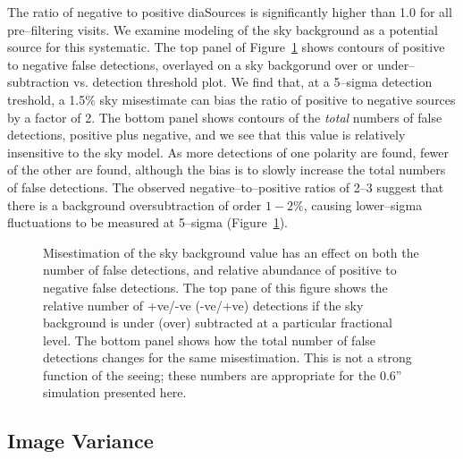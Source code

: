 \documentclass[floatfix, apj]{emulateapj}
\begin{document}
The ratio of negative to positive diaSources is significantly higher than 1.0 for all pre--filtering visits.
We examine modeling of the sky background as a potential source for this systematic.
The top panel of Figure~\ref{fig:2} shows contours of positive to negative false detections, overlayed on a sky backgorund over or under--subtraction vs. detection threshold plot.
We find that, at a 5--sigma detection treshold, a 1.5\% sky misestimate can bias the ratio of positive to negative sources by a factor of 2.
The bottom panel shows contours of the {\it total} numbers of false detections, positive plus negative, and we see that this value is relatively insensitive to the sky model.
As more detections of one polarity are found, fewer of the other are found, although the bias is to slowly increase the total numbers of false detections.
The observed negative--to--positive ratios of 2--3 suggest that there is a background oversubtraction of order $1-2\%$, causing lower--sigma fluctuations to be measured at 5--sigma (Figure~\ref{fig:2}).
\begin{figure}[!ht]
\centering
{}
\caption{
Misestimation of the sky background value has an effect on both the number of false detections, and relative abundance of positive to negative false detections.
The top pane of this figure shows the relative number of +ve/-ve (-ve/+ve) detections if the sky background is under (over) subtracted at a particular fractional level.
The  bottom panel shows how the total number of false detections changes for the same misestimation.
This is not a strong function of the seeing; these numbers are appropriate for the 0.6'' simulation presented here.
}
\label{fig:2}
\end{figure}

\subsection{Image Variance \label{sec-varmis}}
\end{document}
